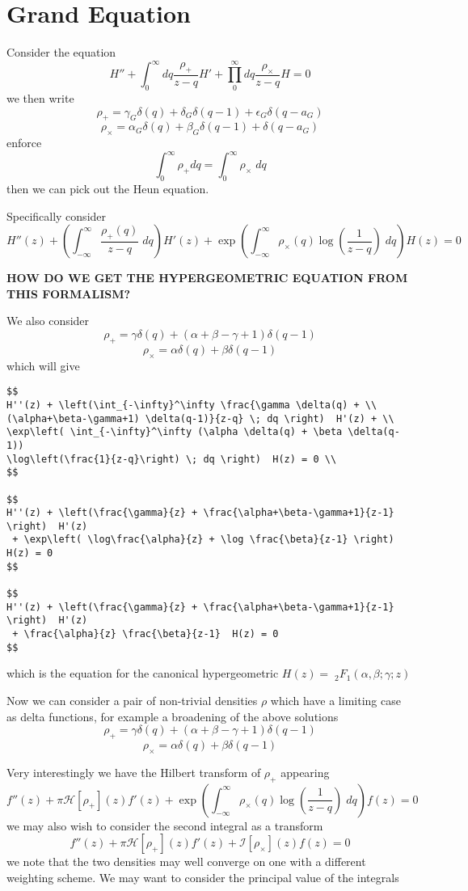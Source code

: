 \documentclass{article}
\begin{document}
\section{Grand Equation}
Consider the equation
$$
H'' + \int_0^\infty dq \frac{\rho_+}{z-q}  H' + \prod_0^\infty dq \frac{\rho_\times}{z-q}  H = 0
$$
we then write
$$
\rho_+ = \gamma_G \delta(q) + \delta_G \delta(q-1) + \epsilon_G \delta(q-a_G)
$$
$$
\rho_\times = \alpha_G \delta(q) + \beta_G \delta(q-1) + \delta(q-a_G)
$$
enforce
$$
\int_0^\infty \rho_+ dq = \int_0^\infty \rho_\times \; dq
$$
then we can pick out the Heun equation.

Specifically consider
$$
H''(z) + \left(\int_{-\infty}^\infty \frac{\rho_+(q)}{z-q} \; dq \right)  H'(z) + \exp\left( \int_{-\infty}^\infty \rho_\times(q) \log\left(\frac{1}{z-q}\right) \; dq \right)  H(z) = 0
$$



\textbf{HOW DO WE GET THE HYPERGEOMETRIC EQUATION FROM THIS FORMALISM?}

We also consider 
$$
\rho_+ = \gamma \delta(q) + (\alpha+\beta-\gamma+1) \delta(q-1)
$$
$$
\rho_\times = \alpha \delta(q) + \beta \delta(q-1)
$$
which will give 
\begin{verbatim}
$$
H''(z) + \left(\int_{-\infty}^\infty \frac{\gamma \delta(q) + \\ 
(\alpha+\beta-\gamma+1) \delta(q-1)}{z-q} \; dq \right)  H'(z) + \\ 
\exp\left( \int_{-\infty}^\infty (\alpha \delta(q) + \beta \delta(q-1)) 
\log\left(\frac{1}{z-q}\right) \; dq \right)  H(z) = 0 \\
$$

$$
H''(z) + \left(\frac{\gamma}{z} + \frac{\alpha+\beta-\gamma+1}{z-1} \right)  H'(z)
 + \exp\left( \log\frac{\alpha}{z} + \log \frac{\beta}{z-1} \right)  H(z) = 0
$$

$$
H''(z) + \left(\frac{\gamma}{z} + \frac{\alpha+\beta-\gamma+1}{z-1} \right)  H'(z)
 + \frac{\alpha}{z} \frac{\beta}{z-1}  H(z) = 0
$$
\end{verbatim}
which is the equation for the canonical hypergeometric $H(z) = \;_2F_1(\alpha,\beta;\gamma;z)$

Now we can consider a pair of non-trivial densities $\rho$ which have a limiting case as delta functions, for example a broadening of the above solutions
$$
\rho_+ = \gamma \delta(q) + (\alpha+\beta-\gamma+1) \delta(q-1)
$$
$$
\rho_\times = \alpha \delta(q) + \beta \delta(q-1)
$$

Very interestingly we have the Hilbert transform of $\rho_+$ appearing
$$
f''(z) + \pi \mathcal{H}[\rho_+](z)  f'(z) + \exp\left( \int_{-\infty}^\infty \rho_\times(q) \log\left(\frac{1}{z-q}\right) \; dq \right)  f(z) = 0
$$
we may also wish to consider the second integral as a transform 
$$
f''(z) + \pi \mathcal{H}[\rho_+](z)  f'(z) + \mathcal{I}[\rho_\times](z) f(z) = 0
$$
we note that the two densities may well converge on one with a different weighting scheme. We may want to consider the principal value of the integrals
\end{document}
